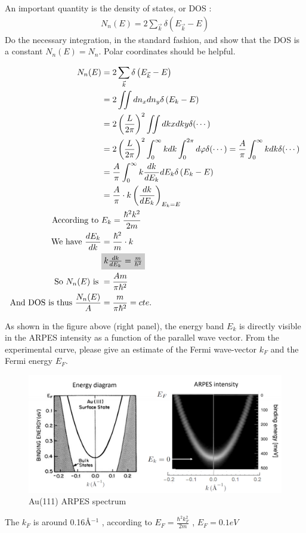 \documentclass[answers]{exam}
\begin{document}
\begin{questions}
\question An important quantity is the density of states, or DOS :
\begin{align*}
    N_{n}(E)=2 \sum_{\vec{k}} \delta\left(E_{\vec{k}}-E\right)
\end{align*}
Do the necessary integration, in the standard fashion, and show that the DOS is a constant $N_{n}(E) = N_{n}$. Polar coordinates should be helpful.
\begin{solution}
\begin{align*}
N_{n}(E)&=2 \sum_{\vec{k}} \delta\left(E_{\vec{k}}-E\right)\\
&=2 \iint d n_{x} d n_{y} \delta\left(E_{k}-E\right) \\
&=2 \left(\frac{L}{2 \pi}\right)^{2} \iint d k x d k y \delta(\cdots) \\
&=2\left(\frac{L}{2 \pi}\right)^{2} \int_{0}^{\infty} k d k \int_{0}^{2 \pi} d \varphi \delta(\cdots)=\frac{A}{\pi} \int_{0}^{\infty} k d k \delta(\cdots) \\
&=\frac{A}{\pi} \int_{0}^{\infty} k \frac{d k}{ {d E_{k}} } {dE_{k}} \delta\left(E_{k}-E\right) \\
&=\frac{A}{\pi} \cdot k \left(\frac{d k}{d E_{k}}\right) _{E_{k}=E} \\
\text{According to }&E_{k}=\frac{\hbar^{2} k^{2}}{2 m}\\
\text{We have }\frac{d E_{k}}{d k}&=\frac{\hbar^{2}}{m} \cdot k \\
&   \colorbox[gray]{0.8}{$k\frac{d k}{d E_{k}}=\frac{m}{\hbar^{2}}$}\\   
\text{So $N_{n}(E)$ is }&=\frac{Am}{\pi\hbar^{2}} \\
\text{And DOS is thus }\frac{N_{n}(E)}{A}&=\frac{m}{\pi\hbar^2}=cte.\\
\end{align*} 
\end{solution}

\question As shown in the figure above (right panel), the energy band $E_{k}$ is directly visible in the ARPES intensity as a function of the parallel wave vector. From
the experimental curve, please give an estimate of the Fermi wave-vector $k_{F}$ and the Fermi energy $E_{F}$.
\begin{figure}[t]
\centering
\includegraphics[width=15cm]{Figure/4.png}
\caption{Au(111) ARPES spectrum}
\end{figure}
\begin{solution}
The $k_{F}$ is around 0.16\AA$^{-1}$ , according to $E_{F}=\frac{\hbar^{2} k_{F}^{2}}{2 m}$ , $E_{F}=0.1eV$
\end{solution}





\end{questions}
\end{document}
